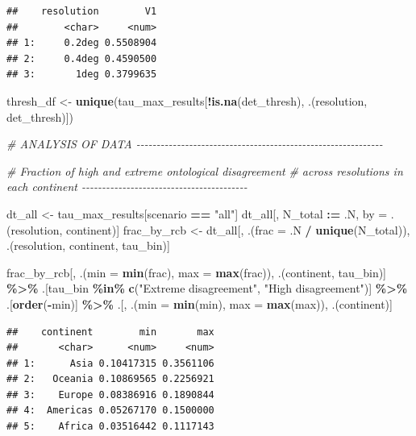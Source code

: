 \documentclass[
  11pt,
]{article}
\newenvironment{Shaded}{\begin{snugshade}}{\end{snugshade}}
\newcommand{\AttributeTok}[1]{\textcolor[rgb]{0.13,0.29,0.53}{#1}}
\newcommand{\CommentTok}[1]{\textcolor[rgb]{0.56,0.35,0.01}{\textit{#1}}}
\newcommand{\FunctionTok}[1]{\textcolor[rgb]{0.13,0.29,0.53}{\textbf{#1}}}
\newcommand{\NormalTok}[1]{#1}
\newcommand{\OtherTok}[1]{\textcolor[rgb]{0.56,0.35,0.01}{#1}}
\newcommand{\SpecialCharTok}[1]{\textcolor[rgb]{0.81,0.36,0.00}{\textbf{#1}}}
\newcommand{\StringTok}[1]{\textcolor[rgb]{0.31,0.60,0.02}{#1}}
\begin{document}
\begin{verbatim}
##    resolution        V1
##        <char>     <num>
## 1:     0.2deg 0.5508904
## 2:     0.4deg 0.4590500
## 3:       1deg 0.3799635
\end{verbatim}

\begin{Shaded}
\begin{Highlighting}[]
\NormalTok{thresh\_df }\OtherTok{\textless{}{-}} \FunctionTok{unique}\NormalTok{(tau\_max\_results[}\SpecialCharTok{!}\FunctionTok{is.na}\NormalTok{(det\_thresh), .(resolution, det\_thresh)])}

\CommentTok{\# ANALYSIS OF DATA {-}{-}{-}{-}{-}{-}{-}{-}{-}{-}{-}{-}{-}{-}{-}{-}{-}{-}{-}{-}{-}{-}{-}{-}{-}{-}{-}{-}{-}{-}{-}{-}{-}{-}{-}{-}{-}{-}{-}{-}{-}{-}{-}{-}{-}{-}{-}{-}{-}{-}{-}{-}{-}{-}{-}{-}{-}{-}{-}{-}{-}}

\CommentTok{\# Fraction of high and extreme ontological disagreement}
\CommentTok{\# across resolutions in each continent {-}{-}{-}{-}{-}{-}{-}{-}{-}{-}{-}{-}{-}{-}{-}{-}{-}{-}{-}{-}{-}{-}{-}{-}{-}{-}{-}{-}{-}{-}{-}{-}{-}{-}{-}{-}{-}{-}{-}{-}{-}}

\NormalTok{dt\_all }\OtherTok{\textless{}{-}}\NormalTok{ tau\_max\_results[scenario }\SpecialCharTok{==} \StringTok{"all"}\NormalTok{]}
\NormalTok{dt\_all[, N\_total }\SpecialCharTok{:=}\NormalTok{ .N, by }\OtherTok{=}\NormalTok{ .(resolution, continent)]}
\NormalTok{frac\_by\_rcb }\OtherTok{\textless{}{-}}\NormalTok{ dt\_all[, .(}\AttributeTok{frac =}\NormalTok{ .N }\SpecialCharTok{/} \FunctionTok{unique}\NormalTok{(N\_total)), }
\NormalTok{                      .(resolution, continent, tau\_bin)]}

\NormalTok{frac\_by\_rcb[, .(}\AttributeTok{min =} \FunctionTok{min}\NormalTok{(frac), }\AttributeTok{max =} \FunctionTok{max}\NormalTok{(frac)), .(continent, tau\_bin)] }\SpecialCharTok{\%\textgreater{}\%}
\NormalTok{  .[tau\_bin }\SpecialCharTok{\%in\%} \FunctionTok{c}\NormalTok{(}\StringTok{"Extreme disagreement"}\NormalTok{, }\StringTok{"High disagreement"}\NormalTok{)] }\SpecialCharTok{\%\textgreater{}\%}
\NormalTok{  .[}\FunctionTok{order}\NormalTok{(}\SpecialCharTok{{-}}\NormalTok{min)] }\SpecialCharTok{\%\textgreater{}\%}
\NormalTok{  .[, .(}\AttributeTok{min =} \FunctionTok{min}\NormalTok{(min), }\AttributeTok{max =} \FunctionTok{max}\NormalTok{(max)), .(continent)]}
\end{Highlighting}
\end{Shaded}

\begin{verbatim}
##    continent        min       max
##       <char>      <num>     <num>
## 1:      Asia 0.10417315 0.3561106
## 2:   Oceania 0.10869565 0.2256921
## 3:    Europe 0.08386916 0.1890844
## 4:  Americas 0.05267170 0.1500000
## 5:    Africa 0.03516442 0.1117143
\end{verbatim}
\end{document}
